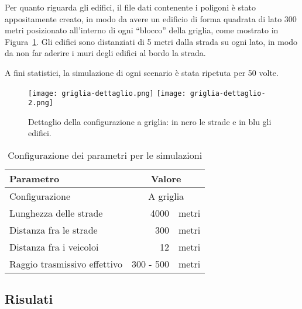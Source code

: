 Per quanto riguarda gli edifici, il file dati contenente i poligoni è stato appositamente creato, in modo da avere un edificio di forma quadrata di lato 300 metri
posizionato all'interno di ogni ``blocco'' della griglia, come mostrato in Figura~\ref{fig:griglia-dettaglio}.
Gli edifici sono distanziati di 5 metri dalla strada su ogni lato, in modo da non far aderire i muri degli edifici al bordo la strada.

A fini statistici, la simulazione di ogni scenario è stata ripetuta per 50 volte. %
\begin{figure}[!h]
	\centering
	\begin{center}
		\texttt{[image: griglia-dettaglio.png]}	%
		\hspace{8pt}
		\texttt{[image: griglia-dettaglio-2.png]}
	\end{center}
	\label{fig:griglia-dettaglio}\caption{Dettaglio della configurazione a griglia: in nero le strade e in blu gli edifici.}
\end{figure}
%
\begin{table}[!h]
	\begin{center}
	  \begin{tabular}{ | m{.5\linewidth} | r  c | }
			\hline
			Parametro											&			\multicolumn{2}{c|}{Valore}			\\ \hline \hline
			Configurazione								&			\multicolumn{2}{c|}{A griglia}		\\ \hline
			Lunghezza delle strade				&			4000 								& metri		\\ \hline
			Distanza fra le strade				&			300 								& metri		\\ \hline
			Distanza fra i veicoloi 			&			12 									& metri		\\ \hline
			Raggio trasmissivo effettivo	&			300 - 500						& metri		\\
			\hline
	  \end{tabular}
	\end{center}
	\caption{Configurazione dei parametri per le simulazioni}
	\label{tab:parametri-simulazioni-barichello}
\end{table}
%
\subsection{Risulati}

















%
